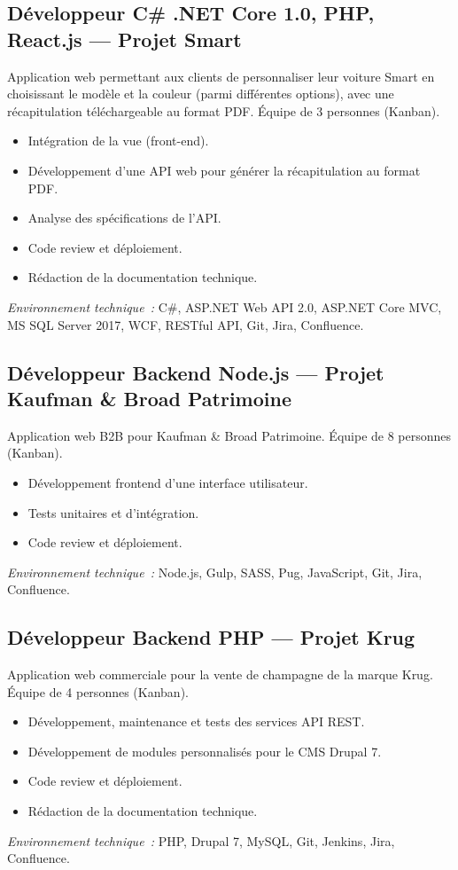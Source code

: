 \documentclass[10pt,a4paper]{article}
\begin{document}
\vspace{6pt}

\subsection*{Développeur C\# .NET Core 1.0, PHP, React.js --- Projet Smart}
\color{darkgray}
Application web permettant aux clients de personnaliser leur voiture Smart en choisissant le modèle et la couleur (parmi différentes options), avec une récapitulation téléchargeable au format PDF. Équipe de 3 personnes (Kanban).
\begin{itemize}
  \item Intégration de la vue (front-end).
  \item Développement d'une API web pour générer la récapitulation au format PDF.
  \item Analyse des spécifications de l'API.
  \item Code review et déploiement.
  \item Rédaction de la documentation technique.
\end{itemize}
\textit{Environnement technique~:} C\#, ASP.NET Web API 2.0, ASP.NET Core MVC, MS SQL Server 2017, WCF, RESTful API, Git, Jira, Confluence.

\vspace{6pt}

\subsection*{Développeur Backend Node.js --- Projet Kaufman \& Broad Patrimoine}
\color{darkgray}
Application web B2B pour Kaufman \& Broad Patrimoine. Équipe de 8 personnes (Kanban).
\begin{itemize}
  \item Développement frontend d'une interface utilisateur.
  \item Tests unitaires et d'intégration.
  \item Code review et déploiement.
\end{itemize}
\textit{Environnement technique~:} Node.js, Gulp, SASS, Pug, JavaScript, Git, Jira, Confluence.

\vspace{6pt}

\subsection*{Développeur Backend PHP --- Projet Krug}
\color{darkgray}
Application web commerciale pour la vente de champagne de la marque Krug. Équipe de 4 personnes (Kanban).
\begin{itemize}
  \item Développement, maintenance et tests des services API REST.
  \item Développement de modules personnalisés pour le CMS Drupal 7.
  \item Code review et déploiement.
  \item Rédaction de la documentation technique.
\end{itemize}
\textit{Environnement technique~:} PHP, Drupal 7, MySQL, Git, Jenkins, Jira, Confluence.
\end{document}
